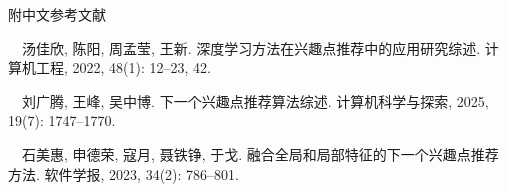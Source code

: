 \documentclass{rjthesis}
\begin{document}
\printbibliography[
	heading=rjrefs,
	title={\textbf{References}}
]

{\xiaowuhao\noindent\hei 附中文参考文献\par}
\songti\fontsize{7pt}{9pt}\selectfont
\vspace{4pt}

\noindent [9]~~汤佳欣, 陈阳, 周孟莹, 王新. 深度学习方法在兴趣点推荐中的应用研究综述. 计算机工程, 2022, 48(1): 12--23, 42.

\vspace{2pt}

\noindent [10]~~刘广腾, 王峰, 吴中博. 下一个兴趣点推荐算法综述. 计算机科学与探索, 2025, 19(7): 1747--1770.

\vspace{2pt}

\noindent [22]~~石美惠, 申德荣, 寇月, 聂铁铮, 于戈. 融合全局和局部特征的下一个兴趣点推荐方法. 软件学报, 2023, 34(2): 786--801.

\rjappendixinfo
\end{document}
